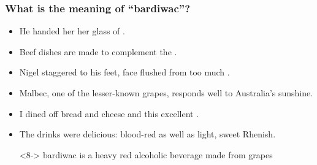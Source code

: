 \documentclass[t]{beamer} %
\begin{document}
\begin{frame}
  \frametitle{What is the meaning of ``\textbf{bardiwac}''?}

  \begin{itemize}
  \item<2-> He handed her her glass of .
  \item<3-> Beef dishes are made to complement the .
  \item<4-> Nigel staggered to his feet, face flushed from too much .
  \item<5-> Malbec, one of the lesser-known  grapes, responds well to Australia's sunshine.
  \item<6-> I dined off bread and cheese and this excellent .
  \item<7-> The drinks were delicious: blood-red  as well as light, sweet Rhenish.
  \item[\hand]<8-> bardiwac is a heavy red alcoholic beverage made from grapes
  \end{itemize}

  \gap
  \begin{small}
  \end{small}
\end{frame}
\end{document}
